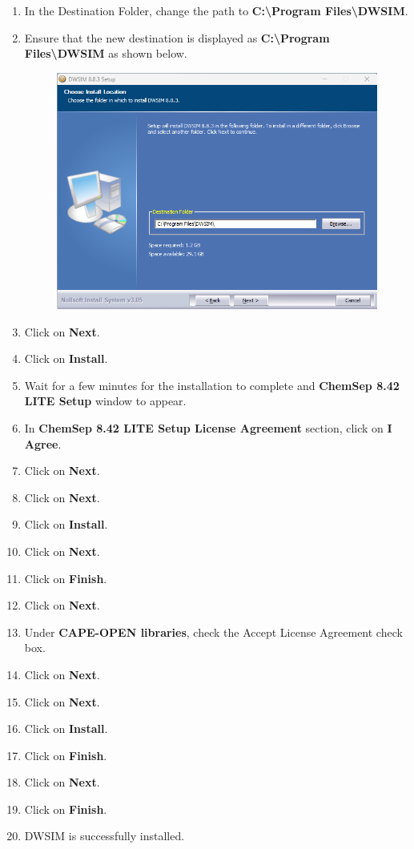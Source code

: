 \documentclass[a4paper,12pt]{article}
\begin{document}
\begin{enumerate}
\begin{figure}[H]
\end{figure}
\item In the Destination Folder, change the path to \textbf{C:\textbackslash Program Files\textbackslash DWSIM}.
\item Ensure that the new destination is displayed as \textbf{C:\textbackslash Program Files\textbackslash DWSIM} as shown below.
\begin{figure}[H]
	\centering
	\includegraphics[width=0.7\linewidth]{DWSIM-Location.png}
\end{figure}
\item Click on \textbf{Next}.
\item Click on \textbf{Install}.
\item Wait for a few minutes for the installation to complete and \textbf{ChemSep 8.42 LITE Setup} window to appear.
\item In \textbf{ChemSep 8.42 LITE Setup License Agreement} section, click on \textbf{I Agree}.
\item Click on \textbf{Next}.
\item Click on \textbf{Next}.
\item Click on \textbf{Install}.
\item Click on \textbf{Next}.
\item Click on \textbf{Finish}.
\item Click on \textbf{Next}.
\item Under \textbf{CAPE-OPEN libraries}, check the Accept License Agreement check box.
\item Click on \textbf{Next}.
\item Click on \textbf{Next}.
\item Click on \textbf{Install}.
\item Click on \textbf{Finish}.
\item Click on \textbf{Next}.
\item Click on \textbf{Finish}.
\item DWSIM is successfully installed.

\end{enumerate}
\end{document}
